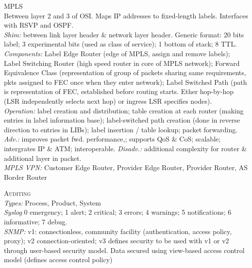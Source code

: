 \documentclass[a4paper, 9pt]{article}
\begin{document}
\textsc{MPLS}\\
Between layer 2 and 3 of OSI. Maps IP addresses to fixed-length labels. Interfaces with RSVP and OSPF.\\
\textit{Shim:} between link layer header \& network layer header. Generic format: 20 bits label; 3 experimental bits (used as class of service); 1 bottom of stack; 8 TTL.\\
\textit{Components:} Label Edge Router (edge of MPLS, assign and remove labels); Label Switching Router (high speed router in core of MPLS network); Forward Equivalence Class (representation of group of packets sharing same requirements, pkts assigned to FEC once when they enter network); Label Switched Path (path is representation of FEC, established before routing starts. Ether hop-by-hop (LSR independently selects next hop) or ingress LSR specifies nodes).\\
\textit{Operation:} label creation and distribution; table creation at each router (making entries in label information base); label-switched path creation (done in reverse direction to entries in LIBs); label insertion / table lookup; packet forwarding. \\
\textit{Adv.:} improves packet fwd. performance,; supports QoS \& CoS; scalable; intergrates IP \& ATM; interoperable. \textit{Disadv.:} additional complexity for router \& additional layer in packet.\\
\textit{MPLS VPN:} Customer Edge Router, Provider Edge Router, Provider Router, AS Border Router

\textsc{Auditing}\\
\textit{Types:} Process, Product, System\\
\textit{Syslog} 0 emergency; 1 alert; 2 critical; 3 errors; 4 warnings; 5 notifications; 6 informative; 7 debug.\\
\textit{SNMP:} v1: connectionless, community facility (authentication, access policy, proxy); v2 connection-oriented; v3 defines security to be used with v1 or v2 through user-based security model. Data secured using view-based access control model (defines access control policy)
\end{document}
